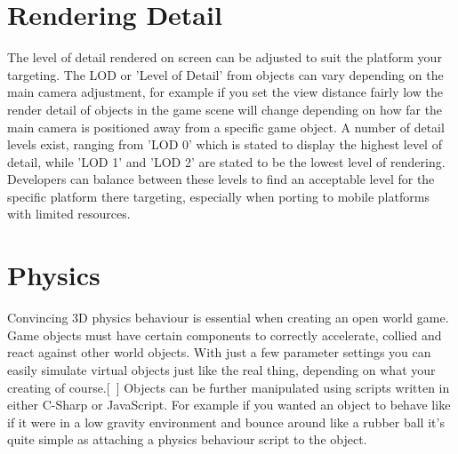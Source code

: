 \section{Rendering Detail}
The level of detail rendered on screen can be adjusted to suit the platform your targeting. The LOD or 'Level of Detail' from objects can vary depending on the main camera adjustment, for example if you set the view distance fairly low the render detail of objects in the game scene will change depending on how far the main camera is positioned away from a specific game object. A number of detail levels exist, ranging from 'LOD 0' which is stated to display the highest level of detail, while 'LOD 1' and 'LOD 2' are stated to be the lowest level of rendering. Developers can balance between these levels to find an acceptable level for the specific platform there targeting, especially when porting to mobile platforms with limited resources.
\section{Physics}
Convincing 3D physics behaviour is essential when creating an open world game. Game objects must have certain components to correctly accelerate, collied and react against other world objects. With just a few parameter settings you can easily simulate virtual objects just like the real thing, depending on what your creating of course.[~\cite{Physics}] Objects can be further manipulated using scripts written in either C-Sharp or JavaScript. For example if you wanted an object to behave like if it were in a low gravity environment and bounce around like a rubber ball it's quite simple as attaching a physics behaviour script to the object.

